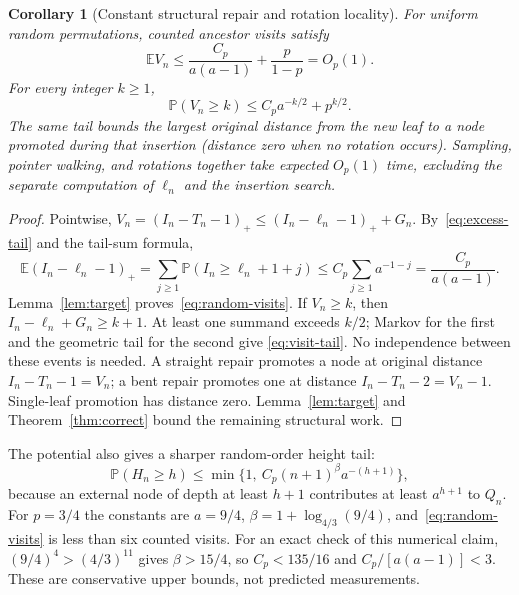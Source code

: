 \documentclass[11pt]{article}
\newtheorem{corollary}[theorem]{Corollary}
\newcommand{\E}{\mathbb E}
\newcommand{\Prob}{\mathbb P}
\begin{document}
\begin{corollary}[Constant structural repair and rotation locality]\label{cor:random-work}
For uniform random permutations, counted ancestor visits satisfy
\begin{equation}
 \E V_n\le \frac{C_p}{a(a-1)}+\frac{p}{1-p}=O_p(1).           \label{eq:random-visits}
\end{equation}
For every integer $k\ge1$,
\begin{equation}
 \Prob(V_n\ge k)\le C_p a^{-k/2}+p^{k/2}.                    \label{eq:visit-tail}
\end{equation}
The same tail bounds the largest original distance from the new leaf to a node
promoted during that insertion (distance zero when no rotation occurs).
Sampling, pointer walking, and rotations together take expected $O_p(1)$ time,
excluding the separate computation of $\ell_n$ and the insertion search.
\end{corollary}
\begin{proof}
Pointwise, $V_n=(I_n-T_n-1)_+\le(I_n-\ell_n-1)_++G_n$.
By~\eqref{eq:excess-tail} and the tail-sum formula,
\[
 \E(I_n-\ell_n-1)_+
 =\sum_{j\ge1}\Prob(I_n\ge\ell_n+1+j)
 \le C_p\sum_{j\ge1}a^{-1-j}=\frac{C_p}{a(a-1)}.
\]
Lemma~\ref{lem:target} proves~\eqref{eq:random-visits}. If $V_n\ge k$,
then $I_n-\ell_n+G_n\ge k+1$. At least one summand exceeds $k/2$;
Markov for the first and the geometric tail for the second give
\eqref{eq:visit-tail}. No independence between these events is needed.
A straight repair promotes a node at original distance $I_n-T_n-1=V_n$;
a bent repair promotes one at distance $I_n-T_n-2=V_n-1$.
Single-leaf promotion has distance zero. Lemma~\ref{lem:target} and
Theorem~\ref{thm:correct} bound the remaining structural work.
\end{proof}

The potential also gives a sharper random-order height tail:
\begin{equation}
 \Prob(H_n\ge h)\le
 \min\{1,\ C_p(n+1)^\beta a^{-(h+1)}\},                     \label{eq:random-height}
\end{equation}
because an external node of depth at least $h+1$ contributes at least $a^{h+1}$
to $Q_n$. For $p=3/4$ the constants are $a=9/4$,
$\beta=1+\log_{4/3}(9/4)$, and~\eqref{eq:random-visits} is less than six
counted visits. For an exact check of this numerical claim,
$(9/4)^4>(4/3)^{11}$ gives $\beta>15/4$, so $C_p<135/16$ and
$C_p/[a(a-1)]<3$. These are conservative upper bounds, not predicted measurements.
\end{document}
